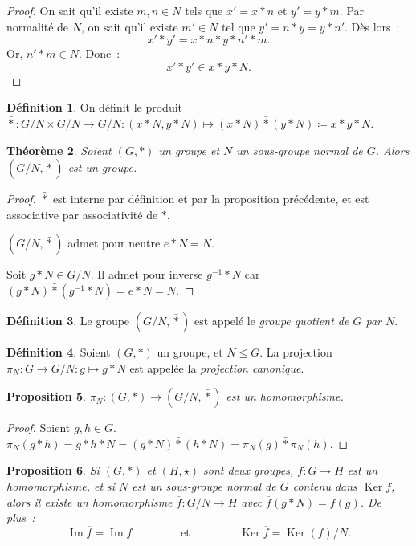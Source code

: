 \documentclass{article}
\newtheorem{thm}{Théorème}[section]
\newtheorem{prp}[thm]{Proposition}
\theoremstyle{definition}
\newtheorem{déf}[thm]{Définition}
\theoremstyle{remark}
\DeclareMathOperator{\Imf}{Im}
\DeclareMathOperator{\Ker}{Ker}
\begin{document}
		\begin{proof} On sait qu'il existe $m, n \in N$ tels que $x' = x*n$ et $y' = y*m$. Par normalité de $N$, on sait qu'il existe $m' \in N$ tel que
		$y' = n*y = y*n'$. Dès lors~:
		\[x'*y' = x*n*y*n'*m.\]
		Or, $n'*m \in N$. Donc~:
		\[x'*y' \in x*y*N.\]
		\end{proof}

		\begin{déf} On définit le produit $\bar * : G/N \times G/N \to G/N : (x*N, y*N) \mapsto (x*N) \bar * (y*N) \coloneqq x*y*N$.
		\end{déf}

		\begin{thm} Soient $(G, *)$ un groupe et $N$ un sous-groupe normal de $G$. Alors $(G/N, \bar *)$ est un groupe.
		\end{thm}

		\begin{proof} $\bar *$ est interne par définition et par la proposition précédente, et est associative par associativité de $*$.

		$(G/N, \bar *)$ admet pour neutre $e*N = N$.

		Soit $g*N \in G/N$. Il admet pour inverse $g^{-1}*N$ car $(g*N) \bar * (g^{-1}*N) = e*N = N$.
		\end{proof}

		\begin{déf} Le groupe $(G/N, \bar *)$ est appelé le \textit{groupe quotient de $G$ par $N$}.
		\end{déf}

		\begin{déf} Soient $(G, *)$ un groupe, et $N \leq G$. La projection $\pi_N : G \to G/N : g \mapsto g*N$ est appelée la \textit{projection canonique}.
		\end{déf}

		\begin{prp} $\pi_N : (G, *) \to (G/N, \bar *)$ est un homomorphisme.
		\end{prp}

		\begin{proof} Soient $g, h \in G$. $\pi_N(g*h) = g*h*N = (g*N) \bar * (h*N) = \pi_N(g) \bar * \pi_N(h)$.
		\end{proof}

		\begin{prp} Si $(G, *)$ et $(H, \star)$ sont deux groupes, $f : G \to H$ est un homomorphisme, et si $N$ est un sous-groupe normal de $G$ contenu dans
		$\Ker f$, alors il existe un homomorphisme $\overline f : G/N \to H$ avec $\overline f(g*N) = f(g)$. De plus~:
		\[\Imf \overline f = \Imf f \qquad\qquad \text{ et } \qquad\qquad \Ker \overline f = \Ker(f)/N.\]
		\end{prp}
\end{document}
